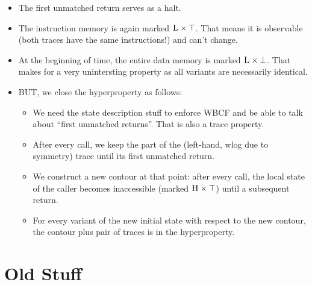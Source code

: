\documentclass[conference]{IEEEtran}
\begin{document}
\begin{itemize}
\item The first unmatched return serves as a halt.  
\item The instruction memory is again marked $\textsc{L} \times \top$. That
  means it is observable (both traces have the same instructions!) and
  can't change.
\item At the beginning of time, the entire data memory is marked $\textsc{L}
  \times \bot$. That makes for a very unintersting property as all
  variants are necessarily identical.
\item BUT, we close the hyperproperty as follows:
  \begin{itemize}
  \item We need the state description stuff to enforce WBCF and be
    able to talk about ``first unmatched returns''. That is also a
    trace property.
  \item After every call, we keep the part of the (left-hand, wlog
    due to symmetry) trace until its first unmatched return.
  \item We construct a new contour at that point: after every call,
    the local state of the caller becomes inaccessible (marked
    $\textsc{H} \times \top$) until a subsequent return.
  \item For every variant of the new initial state with respect to the
    new contour, the contour plus pair of traces is in the
    hyperproperty.
  \end{itemize}
\end{itemize}


\section{Old Stuff}
\end{document}
